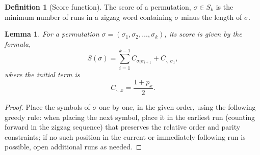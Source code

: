 \documentclass[a4paper,12pt]{article}
\newtheorem{lemma}[theorem]{Lemma}
\theoremstyle{definition}
\newtheorem{definition}[theorem]{Definition}
\numberwithin{equation}{section}
\begin{document}
\begin{definition}[Score function]
    The score of a permutation, $\sigma\in S_k$ is the minimum number of runs in a zigzag word containing $\sigma$ minus the length of $\sigma$.
\end{definition}
\begin{lemma}\label{score}
For a permutation $\sigma = (\sigma_1,\sigma_2,\dots,\sigma_k)$, its \emph{score} is given by the formula,
\begin{equation}\label{ssigma}
S(\sigma) = \sum_{i=1}^{k-1} C_{\sigma_i \sigma_{i+1}}
         + C_{\cdot,\,\sigma_1},    
\end{equation}
where the initial term is
\[
C_{\cdot,\,x} = \frac{1 + p_x}{2}.
\]
\end{lemma}
\begin{proof}
Place the symbols of $\sigma$ one by one, in the given order, using the following greedy rule: when placing the next symbol, place it in the earliest run (counting forward in the zigzag sequence) that preserves the relative order and parity constraints; if no such position in the current or immediately following run is possible, open additional runs as needed.  


\end{proof}
\end{document}

